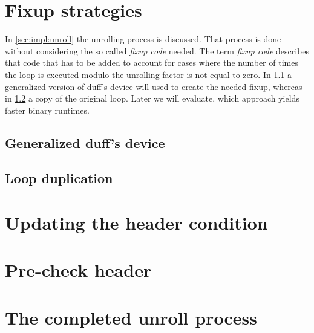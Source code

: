 





\section{Fixup strategies}\label{sec:impl:fixup}

In \cref{sec:impl:unroll} the unrolling process is discussed.
That process is done without considering the so called \textit{fixup code} needed.
The term \textit{fixup code} describes that code that has to be added to account for cases where the number of times the loop is executed modulo the unrolling factor is not equal to zero.
In \cref{sec:impl:fixup:duff} a generalized version of duff's device will used to create the needed fixup, whereas in \cref{sec:impl:fixup:loop} a copy of the original loop.
Later we will evaluate, which approach yields faster binary runtimes.

\subsection{Generalized duff's device}\label{sec:impl:fixup:duff}

\subsection{Loop duplication}\label{sec:impl:fixup:loop}

\section{Updating the header condition}\label{sec:impl:fixup:header-cond}

\section{Pre-check header}\label{sec:impl:preheader}

\section{The completed unroll process}\label{sec:impl:complete}